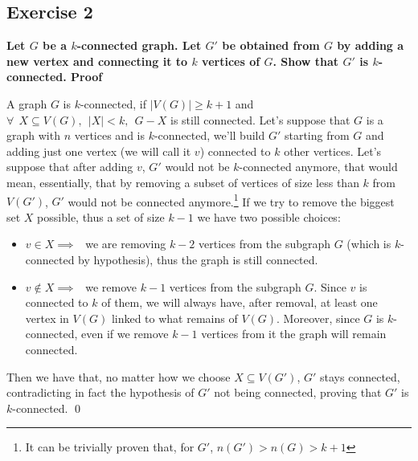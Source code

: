 \subsection*{Exercise 2}
\boldmath
\textbf{Let $G$ be a $k$-connected graph. Let $G'$ be obtained from $G$ by adding a new vertex and
connecting it to $k$ vertices of $G$. Show that $G'$ is $k$-connected.\spacer
Proof}
\unboldmath

A graph $G$ is $k$-connected, if $|V(G)| \geq k+1$ and $\forall \:\:X \subseteq V(G), \:\:|X| < k, \:\:G - X$ is still connected.\spacer
Let's suppose that $G$ is a graph with $n$ vertices and is $k$-connected, we'll build $G'$ starting
from $G$ and adding just one vertex (we will call it $v$) connected to $k$ other vertices.\spacer
Let's suppose that after adding $v$, $G'$ would not be $k$-connected anymore, that would mean, essentially, that by removing a subset of vertices of size less than $k$ from $V(G')$, $G'$ would not be connected anymore.\footnote{It can be trivially proven that, for $G'$, $n(G') > n(G) > k + 1$}\spacer
If we try to remove the biggest set $X$ possible, thus a set of size $k - 1$ we have two possible
choices:
\begin{itemize}
    \item $v \in X \implies \:\:$ we are removing $k - 2$ vertices from the subgraph $G$ (which is $k$-connected by hypothesis), thus the graph is still connected.
    \item $v \notin X \implies \:\:$ we remove $k - 1$ vertices from the subgraph $G$. Since $v$ is connected to $k$ of them, we will always have, after removal, at least one vertex in $V(G)$ linked to what remains of $V(G)$. Moreover, since $G$ is $k$-connected, even if we remove $k - 1$ vertices from it the graph will remain connected.
\end{itemize}
Then we have that, no matter how we choose $X \subseteq V(G')$, $G'$ stays connected,
contradicting in fact the hypothesis of $G'$ not being connected, proving that $G'$ is $k$-connected. \qed
